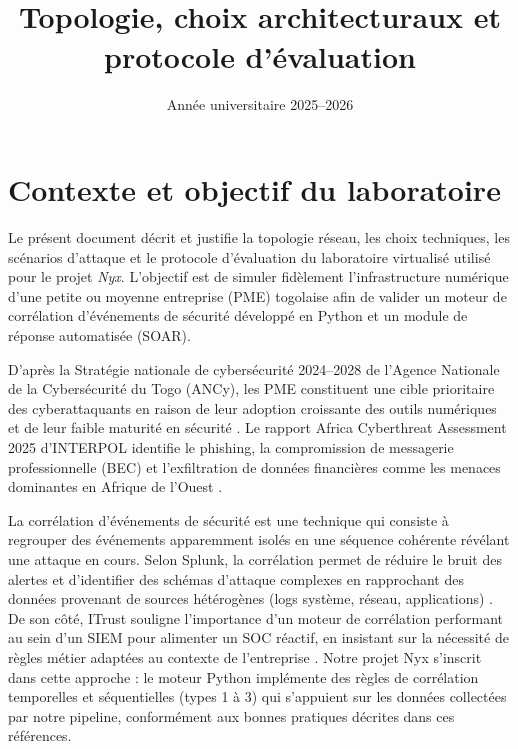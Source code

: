 \documentclass[12pt,a4paper]{article}
\title{%
   \\[0.5em]
    \LARGE Topologie, choix architecturaux et protocole d'évaluation\\
   
}
\date{Année universitaire 2025--2026}
\begin{document}
\maketitle
\newpage
\tableofcontents
\newpage

\section{Contexte et objectif du laboratoire}

Le présent document décrit et justifie la topologie réseau, les choix
techniques, les scénarios d'attaque et le protocole d'évaluation du
laboratoire virtualisé utilisé pour le projet \textit{Nyx}. L'objectif
est de simuler fidèlement l'infrastructure numérique d'une petite ou moyenne
entreprise (PME) togolaise afin de valider un moteur de corrélation
d'événements de sécurité développé en Python et un module de réponse
automatisée (SOAR).

D'après la Stratégie nationale de cybersécurité 2024--2028 de l'Agence
Nationale de la Cybersécurité du Togo (ANCy), les PME constituent une cible
prioritaire des cyberattaquants en raison de leur adoption croissante des
outils numériques et de leur faible maturité en sécurité
\cite{ancy_strategie}. Le rapport Africa Cyberthreat Assessment 2025
d'INTERPOL identifie le phishing, la compromission de messagerie
professionnelle (BEC) et l'exfiltration de données financières comme les
menaces dominantes en Afrique de l'Ouest \cite{interpol2025}.

La corrélation d'événements de sécurité est une technique qui consiste à
regrouper des événements apparemment isolés en une séquence cohérente
révélant une attaque en cours. Selon Splunk, la corrélation permet de
réduire le bruit des alertes et d'identifier des schémas d'attaque
complexes en rapprochant des données provenant de sources hétérogènes
(logs système, réseau, applications) \cite{splunk_correlation}. De son
côté, ITrust souligne l'importance d'un moteur de corrélation performant
au sein d'un SIEM pour alimenter un SOC réactif, en insistant sur la
nécessité de règles métier adaptées au contexte de l'entreprise
\cite{itrust_siem}. Notre projet Nyx s'inscrit dans cette approche :
le moteur Python implémente des règles de corrélation temporelles et
séquentielles (types 1 à 3) qui s'appuient sur les données collectées
par notre pipeline, conformément aux bonnes pratiques décrites dans ces
références.
\end{document}
